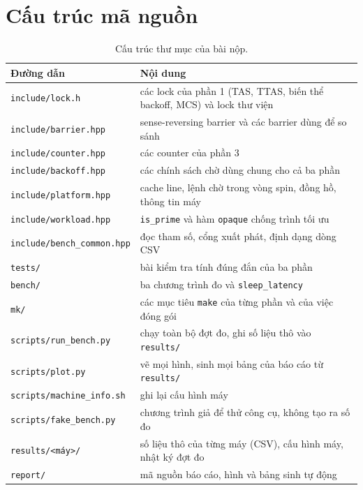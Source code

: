 \documentclass[a4paper]{article}
\begin{document}
\section{Cấu trúc mã nguồn}
\begin{table}[H]\centering\small
\begin{tabular}{@{}lp{10.2cm}@{}}
\toprule
\textbf{Đường dẫn} & \textbf{Nội dung} \\
\midrule
\texttt{include/lock.h} & các lock của phần 1 (TAS, TTAS, biến thể backoff, MCS) và lock thư viện \\
\texttt{include/barrier.hpp} & sense-reversing barrier và các barrier dùng để so sánh \\
\texttt{include/counter.hpp} & các counter của phần 3 \\
\texttt{include/backoff.hpp} & các chính sách chờ dùng chung cho cả ba phần \\
\texttt{include/platform.hpp} & cache line, lệnh chờ trong vòng spin, đồng hồ, thông tin máy \\
\texttt{include/workload.hpp} & \texttt{is\_prime} và hàm \texttt{opaque} chống trình tối ưu \\
\texttt{include/bench\_common.hpp} & đọc tham số, cổng xuất phát, định dạng dòng CSV \\
\texttt{tests/} & bài kiểm tra tính đúng đắn của ba phần \\
\texttt{bench/} & ba chương trình đo và \texttt{sleep\_latency} \\
\texttt{mk/} & các mục tiêu \texttt{make} của từng phần và của việc đóng gói \\
\texttt{scripts/run\_bench.py} & chạy toàn bộ đợt đo, ghi số liệu thô vào \texttt{results/} \\
\texttt{scripts/plot.py} & vẽ mọi hình, sinh mọi bảng của báo cáo từ \texttt{results/} \\
\texttt{scripts/machine\_info.sh} & ghi lại cấu hình máy \\
\texttt{scripts/fake\_bench.py} & chương trình giả để thử công cụ, không tạo ra số đo \\
\texttt{results/<máy>/} & số liệu thô của từng máy (CSV), cấu hình máy, nhật ký đợt đo \\
\texttt{report/} & mã nguồn báo cáo, hình và bảng sinh tự động \\
\bottomrule
\end{tabular}
\caption{Cấu trúc thư mục của bài nộp.}\label{tab:layout}
\end{table}
\end{document}
